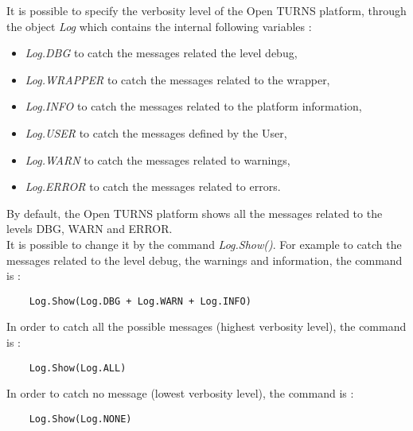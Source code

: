 \renewcommand{\filename}{docUC_Intro_VerbosityLevel}
\renewcommand{\filetitle}{Verbosity level of the Open TURNS platform}

\HeaderNNIILevel


It is possible to specify the verbosity level of the Open TURNS platform, through the object {\itshape Log} which contains the internal following variables :
\begin{itemize}
\item {\itshape Log.DBG} to catch the messages related the level debug,
\item {\itshape Log.WRAPPER} to catch the messages related to the wrapper,
\item {\itshape Log.INFO} to catch the messages related to the platform information,
\item {\itshape Log.USER} to catch the messages defined by the User,
\item {\itshape Log.WARN} to catch the messages related to warnings,
\item {\itshape Log.ERROR} to catch the messages related to errors.
\end{itemize}
By default, the Open TURNS platform shows all the messages related to the levels DBG, WARN and ERROR.\\
It is possible to change it by the command {\itshape Log.Show()}. For example to catch the messages related to the level debug, the warnings and information, the command is :
\begin{center}
  \begin{lstlisting}
    Log.Show(Log.DBG + Log.WARN + Log.INFO)
  \end{lstlisting}
\end{center}
In order to catch all the possible messages (highest verbosity level), the command is :
\begin{center}
  \begin{lstlisting}
    Log.Show(Log.ALL)
  \end{lstlisting}
\end{center}
In order to catch no message (lowest verbosity level), the command is :
\begin{center}
  \begin{lstlisting}
    Log.Show(Log.NONE)
  \end{lstlisting}
\end{center}

